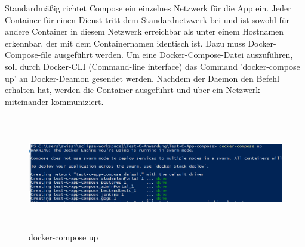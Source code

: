 \documentclass[a4paper,12pt,oneside]{book}
\begin{document}
\newline
Standardmäßig richtet Compose ein einzelnes Netzwerk für die App ein. Jeder Container für einen Dienst tritt dem Standardnetzwerk bei und ist sowohl für andere Container in diesem Netzwerk erreichbar als unter einem Hostnamen erkennbar, der mit dem Containernamen identisch ist. 
\newline
Dazu muss Docker-Compose-file ausgeführt werden. Um eine Docker-Compose-Datei auszuführen, soll durch Docker-CLI (Command-line interface) das Command 'docker-compose up' an Docker-Deamon gesendet werden.
\newline
Nachdem der Daemon den Befehl erhalten hat, werden die Container ausgeführt und über ein Netzwerk miteinander kommuniziert.
\newpage
\begin{figure}[h!]
	\begin{center}
		\includegraphics[width=17cm, height=5cm]{composeUp.PNG}
		\caption{docker-compose up} 
		\label{docker-compose up} 
	\end{center}
\end{figure}
\end{document}
